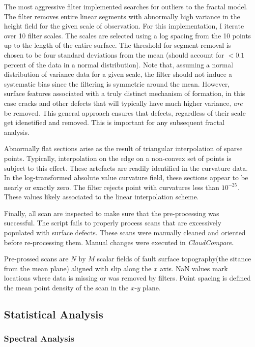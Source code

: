 \documentclass[12pt,a4paper]{article}
\begin{document}
The most aggressive filter implemented searches for outliers to the fractal model. The filter removes entire linear segments with abnormally high variance in the height field for the given scale of observation. For this implementation, I iterate over 10 filter scales. The scales are selected using a log spacing from the 10 points up to the length of the entire surface. The threshold for segment removal is chosen to be four standard deviations from the mean (should account for $<0.1$ percent of the data in a normal distribution). Note that, assuming a normal distribution of variance data for a given scale, the filter should not induce a systematic bias since the filtering is symmetric around the mean. However, surface features associated with a truly distinct mechanism of formation, in this case cracks and other defects that will typically have much higher variance, \textit{are} be removed. This general approach ensures that defects, regardless of their scale get idenetified and removed. This is important for any subsequent fractal analysis.

Abnormally flat sections arise as the result of triangular interpolation of sparse points. Typically, interpolation on the edge on a non-convex set of points is subject to this effect. These artefacts are readily identified in the curvature data. In the log-transformed absolute value curvature field, these sections appear to be nearly or exactly zero. The filter rejects point with curvatures less than $10^{-25}$. These values likely associated to the linear interpolation scheme.

Finally, all scan are inspected to make sure that the pre-processing was successful. The script fails to properly process scans that are excessively populated with surface defects. These scans were manually cleaned and oriented before re-processing them. Manual changes were executed in \textit{CloudCompare}. 

Pre-prossed scans are $N$ by $M$ scalar fields of fault surface topography(the sitance from the mean plane) aligned with slip along the $x$ axis. NaN values mark locations where data is missing or was removed by filters. Point spacing is defined the mean point density of the scan in the $x$-$y$ plane.
	\subsection{Statistical Analysis}
		

		\subsubsection{Spectral Analysis}
		
\end{document}
